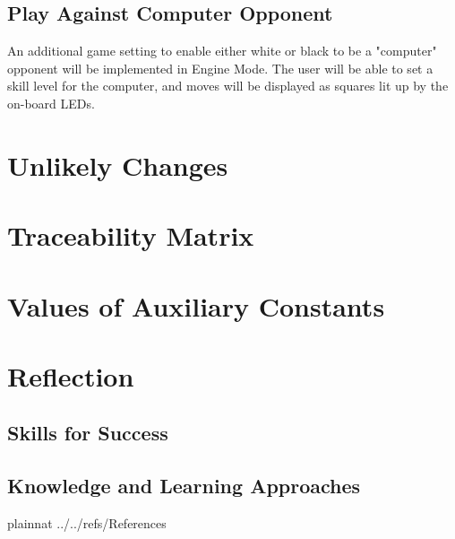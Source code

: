 \documentclass[12pt]{article}
\begin{document}
\subsection{Play Against Computer Opponent}{
    An additional game setting to enable either white or black to be a "computer" opponent will be implemented in Engine Mode. The user will be able to set a skill level
    for the computer, and moves will be displayed as squares lit up by the on-board LEDs.
}

\section{Unlikely Changes}

\section{Traceability Matrix}

\appendix
\section{Values of Auxiliary Constants}

\newpage

\appendix
\section{Reflection}
\subsection{Skills for Success}
\subsection{Knowledge and Learning Approaches}

\newpage

 {plainnat}
 {../../refs/References}
\end{document}
